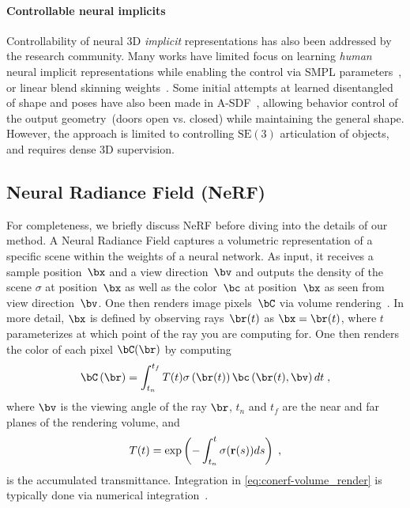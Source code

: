   \paragraph{Controllable neural implicits}
    Controllability of neural 3D \textit{implicit} representations has also
    been addressed by the research community.
    Many works have limited focus on learning \textit{human} neural implicit
    representations while enabling the control via SMPL
    parameters~\cite{loper2015smpl}, or linear blend skinning
    weights~\cite{zheng2021pamir, he2021arch++, saito2021scanimate,
    mihajlovic2021leap, ma2021scale, deng2020nasa, alldieck2021imghum,
    zins2021data}.
    Some initial attempts at learned disentangled of shape and poses have also
    been made in A-SDF~\cite{mu2021sdf}, allowing behavior control of the
    output geometry~(\eg doors open vs.
    closed) while maintaining the general shape.
    However, the approach is limited to controlling $\text{SE}(3)$
    articulation of objects, and requires dense 3D supervision.
  \subsection{Neural Radiance Field (NeRF)}
    For completeness, we briefly discuss NeRF before diving into the details
    of our method.
    A Neural Radiance Field captures a volumetric representation of a specific
    scene within the weights of a neural network.
    As input, it receives a sample position~$\bx$ and a view direction~$\bv$
    and outputs the density of the scene $\sigma$ at position~$\bx$ as well as
    the color~$\bc$ at position~$\bx$ as seen from view direction~$\bv$.
    One then renders image pixels~$\bC$ via volume
    rendering~\cite{kajiya1984ray}.
    In more detail, $\bx$ is defined by observing rays~$\br(t)$ as
    \mbox{$\bx=\br(t)$}, where $t$ parameterizes at which point of the ray you
    are computing for.
    One then renders the color of each pixel $\bC(\br)$ by computing
    \begin{equation}
      \bC\left(\br\right) = \int_{t_n}^{t_f} T(t) \sigma\left(\br(t)\right) \bc\left(\br(t), \bv\right) dt
      \;,
      \label{eq:conerf-volume_render}
    \end{equation}
    where $\bv$ is the viewing angle of the ray $\br$, $t_n$ and $t_f$ are the near and far planes of the rendering volume, and
    \begin{equation}
      T(t) = \exp \left ( - \int_{t_n}^t \sigma({\bf r}(s)) ds \right ) \;,
      \end{equation} is the accumulated transmittance.
    Integration in \cref{eq:conerf-volume_render} is typically done via
    numerical integration~\cite{mildenhall2020nerf}.

